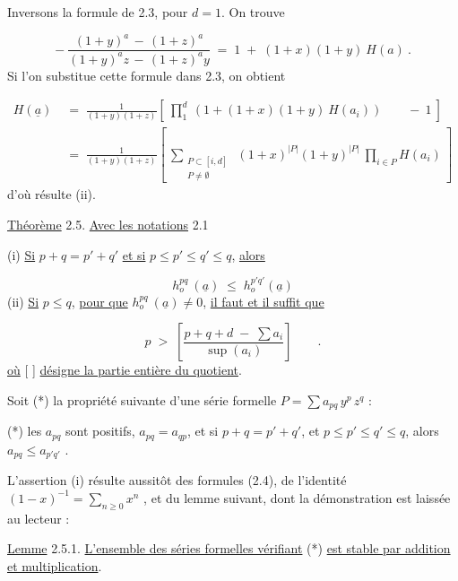 Inversons la formule de 2.3, pour $d = 1$. On trouve

\begin{equation*}
-\ \frac{(1+y)^{a} \,-\, (1+z)^{a}}{(1+y)^{a}z \,-\, (1+z)^{a}y} \;=\; 1 \;+\; (1+x)(1+y)\ H(a)\ .
\end{equation*}
Si l'on substitue cette formule dans 2.3, on obtient

\begin{equation*}
\begin{aligned}
H(\underline{a}) \;&=\; \frac{1}{(1+y)(1+z)}\left[\ \prod_{1}^{d}\ (1+(1+x)(1+y)\ H(a_{i}))\qquad -\ 1\ \right]\\[2ex]
&=\;\frac{1}{(1+y)(1+z)}\left[\ \sum_{\substack{P \subset [i,d] \\ P \neq \emptyset}}\ (1+x)^{|P|}(1+y)^{|P|}\ \prod_{i \in P} H(a_{i})\ \right]
\end{aligned}
\end{equation*}
d'où résulte (ii).

\underline{Théorème} 2.5. \underline{Avec les notations} 2.1

(i) \quad \underline{Si} $p+q = p'+q'$ \underline{et si} $p \leq p' \leq q' \leq q$, \underline{alors}

\begin{equation*}
h_{o}^{pq}\ (\underline{a}) \;\leq\; h_{o}^{p'q'}(\underline{a})
\end{equation*}
(ii) \quad \underline{Si} $p \leq q$, \underline{pour que} $h_{o}^{pq}\ (\underline{a}) \neq 0$, \underline{il faut et il suffit que} 



\begin{equation*}
 p \;>\; \left[\frac{p+q+d \;-\; \sum a_i}{\sup(a_i)}\right] \qquad .
\end{equation*}
\underline{où} [ ] \underline{désigne la partie entière du quotient}.

Soit (*) la propriété suivante d'une série formelle $P = \sum a_{pq} \, y^p \, z^q$ :

(*)  les $a_{pq}$ sont positifs, $a_{pq} = a_{qp}$, et si $p+q = p'+q'$, et $p \leqslant p' \leqslant q' \leqslant q$, alors $a_{pq} \leqslant a_{p'q'}$ .

L'assertion (i) résulte aussitôt des formules (2.4), de l'identité $(1-x)^{-1} = \sum_{n \geqslant 0} x^n$ , et du lemme suivant, dont la démonstration est laissée au lecteur :

\underline{Lemme} 2.5.1. \underline{L'ensemble des séries formelles vérifiant} (*) \underline{est stable par addition et multiplication}.

